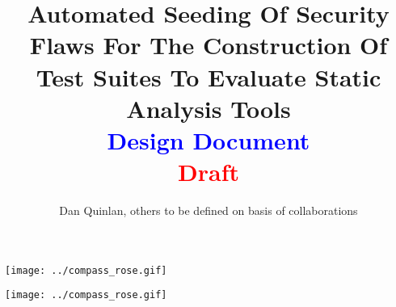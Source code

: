 \documentclass[10pt]{article}
\begin{document}

\title{ {\bf Automated Seeding Of Security Flaws For The Construction Of Test Suites To Evaluate Static Analysis Tools \\
                              \textcolor{blue}{Design Document} \\
                                  \textcolor{red}{ Draft } } }

\label{BugSeeding:postscriptVersionOfUserManual}

\author{Dan Quinlan, others to be defined on basis of collaborations}

\begin{htmlonly}
   \centering \texttt{[image: ../compass\_rose.gif]}
\end{htmlonly}

\maketitle

\begin{htmlonly}
   \centering \texttt{[image: ../compass\_rose.gif]}
\end{htmlonly}




\newpage



\newpage


\newpage


\end{document}
